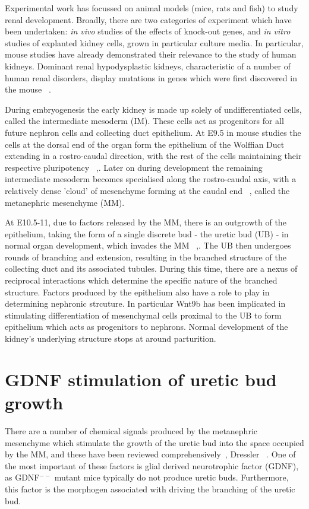 \documentclass[pdftex,10pt,a4paper,twocolumn]{article}
\begin{document}
Experimental work has focussed on animal models (mice, rats and fish) to study renal development. Broadly, there are two categories of experiment which have been undertaken: \textit{in vivo} studies of the effects of knock-out genes, and \textit{in vitro} studies of explanted kidney cells, grown in particular culture media. In particular, mouse studies have already demonstrated their relevance to the study of human kidneys. Dominant renal hypodysplastic kidneys, characteristic of a number of human renal disorders, display mutations in genes which were first discovered in the mouse ~\cite{LittleMMcMahon2012}.

During embryogenesis the early kidney is made up solely of undifferentiated cells, called the intermediate mesoderm (IM). These cells act as progenitors for all future nephron cells and collecting duct epithelium. At E9.5 in mouse studies the cells at the dorsal end of the organ form the epithelium of the Wolffian Duct extending in a rostro-caudal direction, with the rest of the cells maintaining their respective pluripotency ~\cite{CostantiniFKopan2010},\cite{saxen1987early}. Later on during development the remaining intermediate mesoderm becomes specialised along the rostro-caudal axis, with a relatively dense 'cloud' of mesenchyme forming at the caudal end ~\cite{CostantiniFKopan2010}, called the metanephric mesenchyme (MM).

At E10.5-11, due to factors released by the MM, there is an outgrowth of the epithelium, taking the form of a single discrete bud - the uretic bud (UB) - in normal organ development, which invades the MM ~\cite{CostantiniFKopan2010},\cite{LittleMMcMahon2012}. The UB then undergoes rounds of branching and extension, resulting in the branched structure of the collecting duct and its associated tubules. During this time, there are a nexus of reciprocal interactions which determine the specific nature of the branched structure. Factors produced by the epithelium also have a role to play in determining nephronic strcuture. In particular Wnt9b has been implicated in stimulating differentiation of mesenchymal cells proximal to the UB to form epithelium which acts as progenitors to nephrons. Normal development of the kidney's underlying structure stops at around parturition.

\section{GDNF stimulation of uretic bud growth}
There are a number of chemical signals produced by the metanephric mesenchyme which stimulate the growth of the uretic bud into the space occupied by the MM, and these have been reviewed comprehensively~\cite{costantini2006gdnf}, Dressler ~\cite{dressler2006cellular}. One of the most important of these factors is glial derived neurotrophic factor (GDNF), as GDNF$^{--}$ mutant mice typically do not produce uretic buds. Furthermore, this factor is the morphogen associated with driving the branching of the uretic bud.
\end{document}
